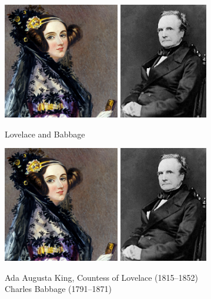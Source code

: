 \documentclass[xcolor={usenames,dvipsnames,svgnames,table},12pt]{beamer}
\begin{document}
\begin{frame}{}
  \begin{center}
    \includegraphics[height=2in]{ada-lovelace}
    \includegraphics[height=2in]{Babbage}
  \end{center}
\end{frame}

\begin{frame}{Lovelace and Babbage}
  \begin{center}
    \includegraphics[height=2in]{ada-lovelace}
    \includegraphics[height=2in]{Babbage}

    Ada Augusta King, Countess of Lovelace (1815--1852)\\
    Charles Babbage (1791--1871)
  \end{center}
\end{frame}
\end{document}
